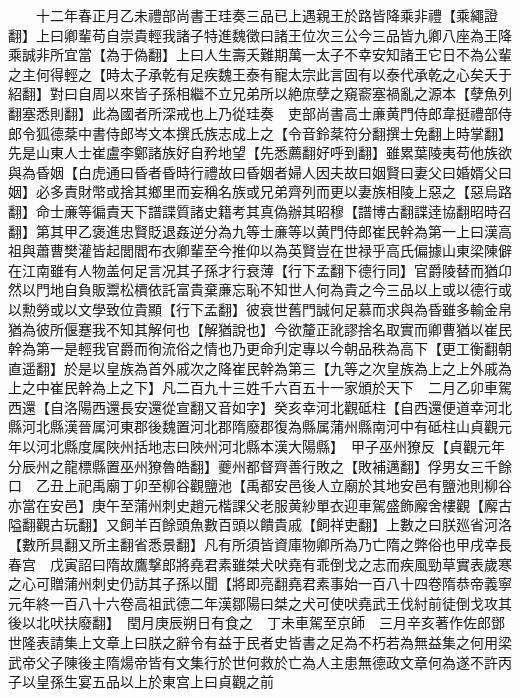 　　十二年春正月乙未禮部尚書王珪奏三品已上遇親王於路皆降乘非禮【乘繩證翻】上曰卿輩苟自崇貴輕我諸子特進魏徵曰諸王位次三公今三品皆九卿八座為王降乘誠非所宜當【為于偽翻】上曰人生壽夭難期萬一太子不幸安知諸王它日不為公輩之主何得輕之【時太子承乾有足疾魏王泰有寵太宗此言固有以泰代承乾之心矣夭于紹翻】對曰自周以來皆子孫相繼不立兄弟所以絶庶孽之窺窬塞禍亂之源本【孽魚列翻塞悉則翻】此為國者所深戒也上乃從珪奏　吏部尚書高士亷黄門侍郎韋挺禮部侍郎令狐德棻中書侍郎岑文本撰氏族志成上之【令音鈴棻符分翻撰士免翻上時掌翻】先是山東人士崔盧李鄭諸族好自矜地望【先悉薦翻好呼到翻】雖累葉陵夷苟他族欲與為昏姻【白虎通曰昏者昏時行禮故曰昏姻者婦人因夫故曰姻賢曰妻父曰婚婿父曰姻】必多責財幣或捨其鄉里而妄稱名族或兄弟齊列而更以妻族相陵上惡之【惡烏路翻】命士亷等徧責天下譜諜質諸史籍考其真偽辦其昭穆【譜博古翻諜逹協翻昭時召翻】第其甲乙褒進忠賢貶退姦逆分為九等士亷等以黄門侍郎崔民幹為第一上曰漢高祖與蕭曹樊灌皆起閭閻布衣卿輩至今推仰以為英賢豈在世禄乎高氏偏據山東梁陳僻在江南雖有人物盖何足言况其子孫才行衰薄【行下孟翻下德行同】官爵陵替而猶卬然以門地自負販鬻松檟依託富貴棄亷忘恥不知世人何為貴之今三品以上或以德行或以勲勞或以文學致位貴顯【行下孟翻】彼衰世舊門誠何足慕而求與為昏雖多輸金帛猶為彼所偃蹇我不知其解何也【解猶說也】今欲釐正訛謬捨名取實而卿曹猶以崔民幹為第一是輕我官爵而徇流俗之情也乃更命刋定專以今朝品秩為高下【更工衡翻朝直遥翻】於是以皇族為首外戚次之降崔民幹為第三【九等之次皇族為上之上外戚為上之中崔民幹為上之下】凡二百九十三姓千六百五十一家頒於天下　二月乙卯車駕西還【自洛陽西還長安還從宣翻又音如字】癸亥幸河北觀砥柱【自西還便道幸河北縣河北縣漢晉属河東郡後魏置河北郡隋廢郡復為縣属蒲州縣南河中有砥柱山貞觀元年以河北縣度属陜州括地志曰陜州河北縣本漢大陽縣】　甲子巫州獠反【貞觀元年分辰州之龍標縣置巫州獠魯皓翻】夔州都督齊善行敗之【敗補邁翻】俘男女三千餘口　乙丑上祀禹廟丁卯至柳谷觀鹽池【禹都安邑後人立廟於其地安邑有鹽池則柳谷亦當在安邑】庚午至蒲州刺史趙元楷課父老服黄紗單衣迎車駕盛飾廨舍樓觀【廨古隘翻觀古玩翻】又飼羊百餘頭魚數百頭以饋貴戚【飼祥吏翻】上數之曰朕廵省河洛【數所具翻又所主翻省悉景翻】凡有所須皆資庫物卿所為乃亡隋之弊俗也甲戌幸長春宫　戊寅詔曰隋故鷹撃郎將堯君素雖桀犬吠堯有乖倒戈之志而疾風勁草實表歲寒之心可贈蒲州刺史仍訪其子孫以聞【將即亮翻堯君素事始一百八十四卷隋恭帝義寧元年終一百八十六卷高祖武德二年漢鄒陽曰桀之犬可使吠堯武王伐紂前徒倒戈攻其後以北吠扶廢翻】　閏月庚辰朔日有食之　丁未車駕至京師　三月辛亥著作佐郎鄧世隆表請集上文章上曰朕之辭令有益于民者史皆書之足為不朽若為無益集之何用梁武帝父子陳後主隋煬帝皆有文集行於世何救於亡為人主患無德政文章何為遂不許丙子以皇孫生宴五品以上於東宫上曰貞觀之前

